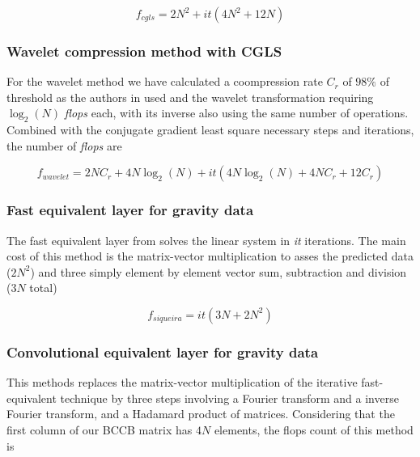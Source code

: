 \begin{equation}
	f_{cgls} = 2N^2 + it(4N^2 + 12N)
\label{cgls}
\end{equation}

\subsubsection{Wavelet compression method with CGLS \citep{li-oldenburg2010}}

For the wavelet method we have calculated a coompression rate $C_r$ of $98\%$ of threshold as the authors in \cite{li-oldenburg2010} used and the wavelet transformation requiring $\log_2(N)$ \textit{flops} each, with its inverse also using the same number of operations. Combined with the conjugate gradient least square necessary steps and iterations, the number of \textit{flops} are

\begin{equation}
	f_{wavelet} = 2NC_r + 4N\log_2(N) + it(4N\log_2(N) + 4NC_r + 12C_r)
\label{wavelet}
\end{equation}

\subsubsection{Fast equivalent layer for gravity data \citep{siqueira-etal2017}}

The fast equivalent layer from \cite{siqueira-etal2017} solves the linear system in \textit{it} iterations. The main cost of this method is the matrix-vector multiplication to asses the predicted data ($2N^2$) and three simply element by element vector sum, subtraction and division ($3N$ total)

\begin{equation}
	f_{siqueira} = it(3N +2N^2)
	\label{siqueira}
\end{equation}

\subsubsection{Convolutional equivalent layer for gravity data \citep{takahashi2020}}

This methods replaces the matrix-vector multiplication of the iterative fast-equivalent technique \citep{siqueira-etal2017} by three steps involving a Fourier transform and a inverse Fourier transform, 
and a Hadamard product of matrices. Considering that the first column of our BCCB matrix has $4N$ elements, the flops count of this method is

